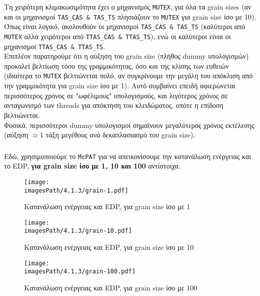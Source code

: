 \documentclass[12pt,a4paper]{article}
\newcommand{\imagesPath}{/home/nick/arch-ntua/ex03/graphs}
\newcommand{\myWidth}{0.8\linewidth}
\begin{document}
				Τη χειρότερη κλιμακωσιμότητα έχει ο μηχανισμός \verb|MUTEX|, για όλα τα grain sizes (αν και οι μηχανισμοί \verb|TAS_CAS & TAS_TS| πλησιάζουν το \verb|MUTEX| για grain size ίσο με 10). Όπως είναι λογικό, ακολουθούν οι μηχανισμοί \verb|TAS_CAS & TAS_TS| (καλύτεροι από \verb|MUTEX| αλλά χειρότεροι από \verb|TTAS_CAS & TTAS_TS|), ενώ οι καλύτεροι είναι οι μηχανισμοί \verb|TTAS_CAS & TTAS_TS|. \\
				
				Επιπλέον παρατηρούμε ότι η αύξηση του grain size (πλήθος dummy υπολογισμών) προκαλεί βελτίωση τόσο της γραμμικότητας, όσο και της κλίσης των ευθειών (ιδιαίτερα το \verb|MUTEX| βελτιώνεται πολύ, αν συγκρίνουμε την μεγάλη του απόκλιση από την γραμμικότητα για grain size ίσο με 1). Αυτό συμβαίνει επειδή αφιερώνεται περισσότερος χρόνος σε "ωφέλιμους" υπολογισμούς, και λιγότερος χρόνος σε ανταγωνισμό των threads για απόκτηση του κλειδώματος, οπότε η επίδοση βελτιώνεται. \\
				
				Φυσικά, περισσότεροι dummy υπολογισμοί σημαίνουν μεγαλύτερος χρόνος εκτέλεσης (αύξηση $\approx$1 τάξη μεγέθους ανά δεκαπλασιασμό του grain size).
			
			\subsubsection{}
				Εδώ, χρησιμοποιούμε το \verb|McPAT| για να απεικονίσουμε την κατανάλωση ενέργειας και το EDP, \textbf{για grain size ίσο με 1, 10 και 100} αντίστοιχα. \\
				
				\begin{figure}[H]
					\begin{center}
						\texttt{[image: \\imagesPath/4.1.3/grain-1.pdf]}
						\caption{Κατανάλωση ενέργειας και EDP, για grain size ίσο με 1}
					\end{center}
				\end{figure}
			
				\begin{figure}[H]
					\begin{center}
						\texttt{[image: \\imagesPath/4.1.3/grain-10.pdf]}
						\caption{Κατανάλωση ενέργειας και EDP, για grain size ίσο με 10}
					\end{center}
				\end{figure}
							
				\begin{figure}[H]
					\begin{center}
						\texttt{[image: \\imagesPath/4.1.3/grain-100.pdf]}
						\caption{Κατανάλωση ενέργειας και EDP, για grain size ίσο με 100}
					\end{center}
				\end{figure}
			
\end{document}
